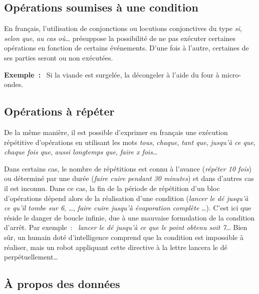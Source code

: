 		\subsection{Opérations soumises à une condition}
		
			En français, 
			l’utilisation de conjonctions ou locutions conjonctives 
			du type \textit{si}, \textit{selon que}, \textit{au cas où}\dots{}
			présuppose la possibilité 
			de ne pas exécuter certaines opérations 
			en fonction de certains événements. 
			D’une fois à l’autre, 
			certaines de ses parties seront ou non exécutées.
			
			\textbf{Exemple~:}~
			Si la viande est surgelée, 
			la décongeler à l’aide du four à micro-ondes.
	
		\subsection{Opérations à répéter}
		
			De la même manière, 
			il est possible d’exprimer en français une exécution
			répétitive d’opérations en utilisant les mots \textit{tous},
			\textit{chaque}, \textit{tant que}, \textit{jusqu’à ce que},
			\textit{chaque fois que}, \textit{aussi longtemps que}, 
			\textit{faire x fois}\dots 
			
			Dans certains cas, 
			le nombre de répétitions est connu à l’avance
			(\textit{répéter 10 fois}) 
			ou déterminé par une durée 
			(\textit{faire cuire pendant 30 minutes}) 
			et dans d’autres cas il est inconnu.
			Dans ce cas, la fin de la période de répétition 
			d’un bloc d’opérations dépend alors 
			de la réalisation d’une condition 
			(\textit{lancer le dé jusqu’à ce qu’il tombe sur 6}, \dots, 
			\textit{faire cuire jusqu’à évaporation complète} \dots). 
			C’est ici que réside le danger de boucle infinie, 
			due à une mauvaise formulation de la condition d’arrêt.
			Par exemple~:~
			\textit{lancer le dé jusqu’à ce que le point obtenu soit 7}\dots 
			Bien sûr, 
			un humain doté d’intelligence comprend 
			que la condition est impossible à réaliser, 
			mais un robot appliquant cette directive à la lettre 
			lancera le dé perpétuellement\dots
	
		\subsection{À propos des données}
		
